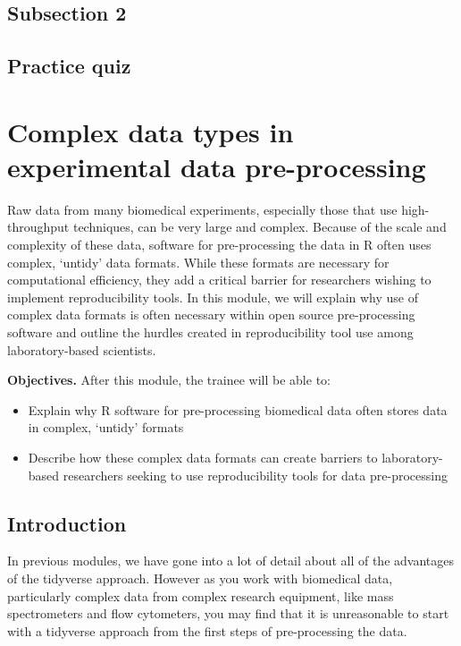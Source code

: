 \documentclass[]{tufte-book}
\providecommand{\tightlist}{%
  \setlength{\itemsep}{0pt}\setlength{\parskip}{0pt}}
\begin{document}
\hypertarget{subsection-2-2}{%
\subsection{Subsection 2}\label{subsection-2-2}}

\hypertarget{practice-quiz-2}{%
\subsection{Practice quiz}\label{practice-quiz-2}}

\hypertarget{module15}{%
\section{Complex data types in experimental data pre-processing}\label{module15}}

Raw data from many biomedical experiments, especially those that use
high-throughput techniques, can be very large and complex. Because of the scale
and complexity of these data, software for pre-processing the data in R often
uses complex, `untidy' data formats. While these formats are necessary for
computational efficiency, they add a critical barrier for researchers wishing to
implement reproducibility tools. In this module, we will explain why use of
complex data formats is often necessary within open source pre-processing
software and outline the hurdles created in reproducibility tool use among
laboratory-based scientists.

\textbf{Objectives.} After this module, the trainee will be able to:

\begin{itemize}
\tightlist
\item
  Explain why R software for pre-processing biomedical data often stores
  data in complex, `untidy' formats
\item
  Describe how these complex data formats can create barriers to
  laboratory-based researchers seeking to use reproducibility tools for
  data pre-processing
\end{itemize}

\hypertarget{introduction}{%
\subsection{Introduction}\label{introduction}}

In previous modules, we have gone into a lot of detail about all of the
advantages of the tidyverse approach. However as you work with biomedical data,
particularly complex data from complex research equipment, like mass
spectrometers and flow cytometers, you may find that it is unreasonable to start
with a tidyverse approach from the first steps of pre-processing the data.
\end{document}
